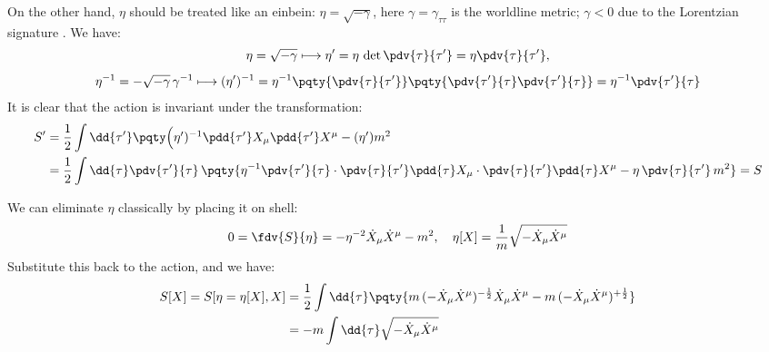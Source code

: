 \documentclass[a4paper,10pt]{article}
\begin{document}
	On the other hand, $\eta$ should be treated like an einbein: $\eta = \sqrt{-\gamma}$, here $\gamma = \gamma_{\tau\tau}$ is the worldline metric; $\gamma < 0$ due to the Lorentzian signature \cite{Polchinski:1998rq}. We have:
	\begin{gather}
		\eta = \sqrt{-\gamma}
		\longmapsto \eta' = \eta\,
			\det \pdv{\tau}{\tau'}
		= \eta \pdv{\tau}{\tau'},
	\\[1ex]
		\eta^{-1}
		= - \sqrt{-\gamma}\,\gamma^{-1}
		\longmapsto (\eta')^{-1} = \eta^{-1}
			\pqty{\pdv{\tau}{\tau'}}
			\pqty{
				\pdv{\tau'}{\tau}
				\pdv{\tau'}{\tau}
			}
		= \eta^{-1} \pdv{\tau'}{\tau}
	\end{gather}
	It is clear that the action is invariant under the transformation:
	\begin{equation}
	\begin{aligned}
		S'
		&= \frac{1}{2} \int \dd{\tau'} \pqty\Big{
				(\eta')^{-1}
					\pdd{\tau'} X_\mu
					\pdd{\tau'} X^\mu
				- (\eta') m^2
			} \\
		&= \frac{1}{2} \int \dd{\tau}
			\pdv{\tau'}{\tau}\,
			\pqty{
				\eta^{-1}
					\pdv{\tau'}{\tau}
					\cdot
					\pdv{\tau}{\tau'}
					\pdd{\tau} X_\mu
					\cdot
					\pdv{\tau}{\tau'}
					\pdd{\tau} X^\mu
				- \eta\,\pdv{\tau}{\tau'}\,m^2
			} = S
	\end{aligned}
	\end{equation}
	
	We can eliminate $\eta$ classically by placing it on shell:
	\begin{equation}
		0 = \fdv{S}{\eta}
		= - \eta^{-2} \dot{X}_\mu \dot{X}^\mu
			- m^2,
	\quad
		\eta[X] = \frac{1}{m}
			\sqrt{-\dot{X}_\mu \dot{X}^\mu}
	\end{equation}
	Substitute this back to the action, and we have:
	\begin{equation}
	\begin{aligned}
		S[X] = S[\eta = \eta[X], X]
		&= \frac{1}{2} \int \dd{\tau} \pqty{
				m\,(
					-\dot{X}_\mu \dot{X}^\mu
				)^{-\frac{1}{2}}
				\dot{X}_\mu \dot{X}^\mu
				- m\,(
					-\dot{X}_\mu \dot{X}^\mu
				)^{+\frac{1}{2}}
			} \\
		&= -m \int \dd{\tau}
			\sqrt{-\dot{X}_\mu \dot{X}^\mu}
	\end{aligned}
	\end{equation}
\end{document}
